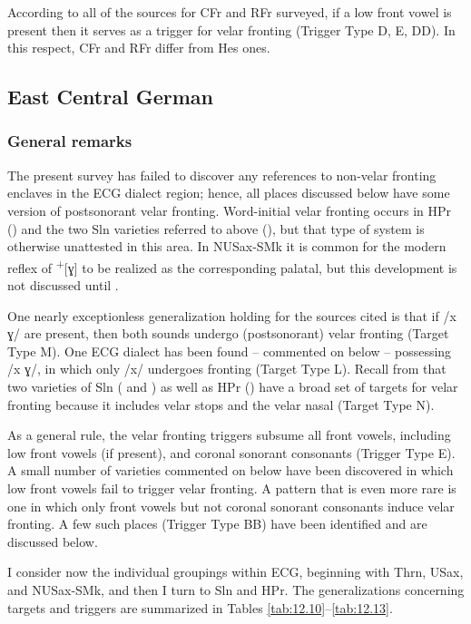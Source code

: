 According to all of the sources for CFr and RFr surveyed, if a low front vowel is present then it serves as a trigger for velar fronting (Trigger Type D, E, DD). In this respect, CFr and RFr differ from Hes ones.

\subsection{East Central German}\label{sec:12.3.5}
\subsubsection{General remarks}
The present survey has failed to discover any references to non-velar fronting enclaves in the ECG dialect region; hence, all places discussed below have some version of postsonorant velar fronting. Word-initial velar fronting occurs in HPr () and the two Sln varieties referred to above (), but that type of system is otherwise unattested in this area. In NUSax-SMk it is common for the modern reflex of  \textsuperscript{+}[ɣ] to be realized as the corresponding palatal, but this development is not discussed until .

One nearly exceptionless generalization holding for the sources cited is that if /x ɣ/ are present, then both sounds undergo (postsonorant) velar fronting (Target Type M). One ECG dialect has been found -- commented on below -- possessing /x ɣ/, in which only /x/ undergoes fronting (Target Type L). Recall from  that two varieties of Sln ( and ) as well as HPr () have a broad set of targets for velar fronting because it includes velar stops and the velar nasal (Target Type N).

As a general rule, the velar fronting triggers subsume all front vowels, including low front vowels (if present), and coronal sonorant consonants (Trigger Type E). A small number of varieties commented on below have been discovered in which low front vowels fail to trigger velar fronting. A pattern that is even more rare is one in which only front vowels but not coronal sonorant consonants induce velar fronting. A few such places (Trigger Type BB) have been identified and are discussed below.

I consider now the individual groupings within ECG, beginning with Thrn, USax, and NUSax-SMk, and then I turn to Sln and HPr. The generalizations concerning targets and triggers are summarized in Tables \ref{tab:12.10}--\ref{tab:12.13}.

